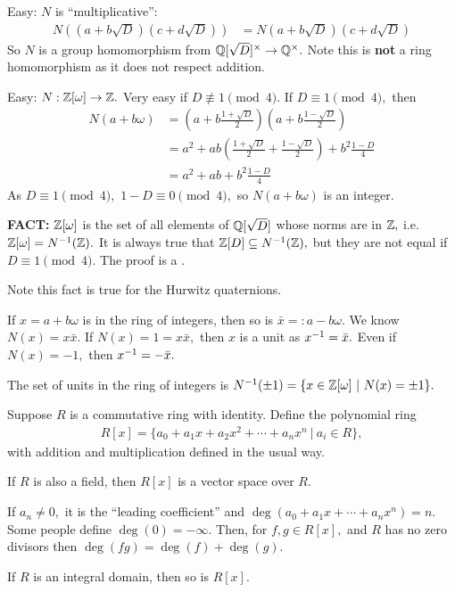 \documentclass[a4paper]{article}
\begin{document}
Easy: $N$ is ``multiplicative'':
\begin{align}
    N((a+b\sqrt D)(c+d\sqrt D))&=N(a+b\sqrt D)(c+d\sqrt D)
\end{align}
So $N$ is a group homomorphism from $\mathbb{Q}[\sqrt D]^\times\to\mathbb{Q}^\times.$ Note this is \textbf{not} a ring homomorphism as it does not respect addition.

Easy: $N:\mathbb{Z}[\omega]\to\mathbb{Z}.$ Very easy if $D\not\equiv 1\pmod 4.$ If $D\equiv 1\pmod4,$ then \begin{align}
    N(a+b\omega)&=\left(a+b\frac{1+\sqrt D}{2}\right)\left(a+b\frac{1-\sqrt D}{2}\right)\\
    &=a^2+ab\left(\frac{1+\sqrt D}{2}+\frac{1-\sqrt D}{2}\right)+b^2\frac{1-D}{4}\\
    &=a^2+ab+b^2\frac{1-D}{4}
\end{align} 
As $D\equiv 1\pmod 4,$ $1-D\equiv 0\pmod 4,$ so $N(a+b\omega)$ is an integer.

\textbf{FACT:} $\mathbb{Z}[\omega]$ is the set of all elements of $\mathbb{Q}[\sqrt D]$ whose norms are in $\mathbb{Z},$ i.e. $\mathbb{Z}[\omega]=N^{-1}(\mathbb{Z}).$ It is always true that $\mathbb{Z}[D]\subseteq N^{-1}(\mathbb{Z}),$ but they are not equal if $D\equiv1\pmod4.$ The proof is a .

Note this fact is true for the Hurwitz quaternions.

If $x=a+b\omega$ is in the ring of integers, then so is $\bar x=:a-b\omega.$ We know $N(x)=x\bar x.$ If $N(x)=1=x\bar x,$ then $x$ is a unit as $x^{-1}=\bar x.$ Even if $N(x)=-1,$ then $x^{-1}=-\bar x.$

The set of units in the ring of integers is $N^{-1}(\pm1)=\{x\in\mathbb{Z}[\omega]~|~N(x)=\pm1\}.$

\begin{definition}[Polynomial]
    Suppose $R$ is a commutative ring with identity. Define the polynomial ring \begin{align}
        R[x]=\{a_0+a_1x+a_2x^2+\cdots+a_nx^n~|~a_i\in R\},
    \end{align}
    with addition and multiplication defined in the usual way.

    If $R$ is also a field, then $R[x]$ is a vector space over $R.$

    If $a_n\neq0,$ it is the ``leading coefficient'' and $\deg(a_0+a_1x+\cdots+a_nx^n)=n.$ Some people define $\deg(0)=-\infty.$ Then, for $f,g\in R[x],$ and $R$ has no zero divisors then $\deg(fg)=\deg(f)+\deg(g).$
\end{definition}
If $R$ is an integral domain, then so is $R[x].$ 
\end{document}

